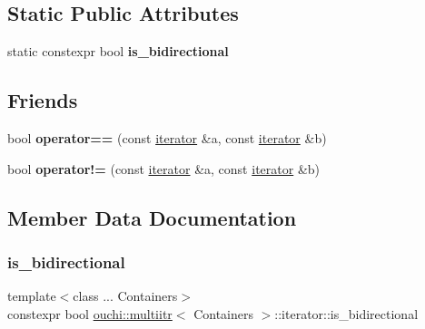 \subsection*{Static Public Attributes}
\begin{DoxyCompactItemize}
\item 
static constexpr bool {\bfseries is\+\_\+bidirectional}
\end{DoxyCompactItemize}
\subsection*{Friends}
\begin{DoxyCompactItemize}
\item 
\mbox{\label{classouchi_1_1multiitr_1_1iterator_a81d10d7799462c7ca5e7cf19119ca356}} 
bool {\bfseries operator==} (const \mbox{\hyperlink{classouchi_1_1multiitr_1_1iterator}{iterator}} \&a, const \mbox{\hyperlink{classouchi_1_1multiitr_1_1iterator}{iterator}} \&b)
\item 
\mbox{\label{classouchi_1_1multiitr_1_1iterator_a55a8ee0e80dad1a7da9d751c25bc0386}} 
bool {\bfseries operator!=} (const \mbox{\hyperlink{classouchi_1_1multiitr_1_1iterator}{iterator}} \&a, const \mbox{\hyperlink{classouchi_1_1multiitr_1_1iterator}{iterator}} \&b)
\end{DoxyCompactItemize}


\subsection{Member Data Documentation}
\mbox{\label{classouchi_1_1multiitr_1_1iterator_a1c7848783e4beccbede85f051ba50932}} 
\subsubsection{\texorpdfstring{is\_bidirectional}{is\_bidirectional}}
{\footnotesize\ttfamily template$<$class ... Containers$>$ \\
constexpr bool \mbox{\hyperlink{classouchi_1_1multiitr}{ouchi\+::multiitr}}$<$ Containers $>$\+::iterator\+::is\+\_\+bidirectional\hspace{0.3cm}{\ttfamily [static]}}

